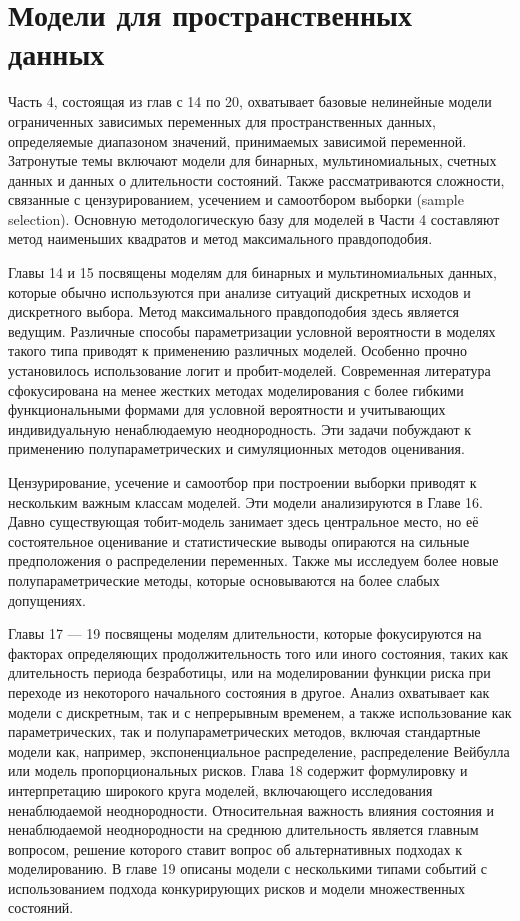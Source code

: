 
\part{Модели для пространственных данных}

Часть 4, состоящая из глав с 14 по 20, охватывает базовые нелинейные модели ограниченных зависимых переменных для пространственных данных,  определяемые диапазоном значений,  принимаемых зависимой переменной. Затронутые темы включают модели для бинарных, мультиномиальных, счетных данных и данных о длительности состояний. Также рассматриваются сложности, связанные с цензурированием, усечением и самоотбором выборки (sample selection). Основную методологическую базу для моделей в Части 4 составляют метод наименьших квадратов и метод максимального правдоподобия.

Главы 14 и 15 посвящены моделям для бинарных и мультиномиальных данных,  которые обычно используются при анализе ситуаций дискретных исходов и дискретного выбора. Метод максимального правдоподобия здесь является ведущим. Различные способы параметризации условной вероятности в моделях такого типа приводят к применению различных моделей. Особенно прочно установилось использование логит и пробит-моделей. Современная литература сфокусирована на менее жестких методах моделирования с более гибкими функциональными формами для условной вероятности и учитывающих индивидуальную ненаблюдаемую неоднородность. Эти задачи побуждают к применению полупараметрических  и симуляционных  методов оценивания.

Цензурирование,  усечение и самоотбор при построении выборки приводят к  нескольким важным классам моделей. Эти модели анализируются в Главе 16. Давно существующая тобит-модель занимает здесь центральное  место,  но её состоятельное оценивание и статистические выводы опираются на сильные  предположения о распределении переменных. Также мы исследуем более новые полупараметрические методы,  которые основываются на более слабых допущениях.

Главы  17 --- 19 посвящены моделям длительности, которые фокусируются на факторах определяющих  продолжительность того или иного состояния,  таких как длительность периода безработицы,  или на моделировании функции риска при переходе из некоторого начального состояния в другое. Анализ охватывает как модели с дискретным,  так и с непрерывным временем,  а также использование как параметрических,  так и полупараметрических методов,  включая стандартные модели как,  например,  экспоненциальное распределение,  распределение Вейбулла или модель пропорциональных рисков. Глава 18 содержит формулировку и интерпретацию широкого круга моделей,  включающего исследования ненаблюдаемой неоднородности. Относительная важность влияния состояния и ненаблюдаемой неоднородности на среднюю длительность является главным вопросом,  решение которого ставит вопрос об альтернативных подходах к моделированию. В главе 19 описаны модели с несколькими типами событий с использованием подхода конкурирующих рисков и модели множественных состояний.


